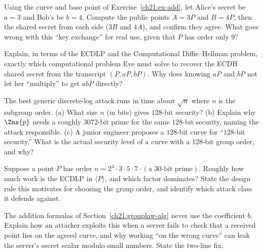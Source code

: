 \begin{exercise}
\label{ch21:ex-ecdh}
Using the curve and base point of Exercise~\ref{ch21:ex-add}, let Alice's secret be
$a=3$ and Bob's be $b=4$. Compute the public points $A=3P$ and $B=4P$, then the shared
secret from each side ($3B$ and $4A$), and confirm they agree. What goes wrong with this
``key exchange'' for real use, given that $P$ has order only $9$?
\end{exercise}

\begin{exercise}
\label{ch21:ex-eve}
Explain, in terms of the ECDLP and the Computational Diffie--Hellman problem, exactly
which computational problem Eve must solve to recover the ECDH shared secret from the
transcript $(P, aP, bP)$. Why does knowing $aP$ and $bP$ not let her ``multiply'' to get
$abP$ directly?
\end{exercise}

\begin{exercise}
\label{ch21:ex-keysize}
The best generic discrete-log attack runs in time about $\sqrt n$ where $n$ is the
subgroup order. (a) What size $n$ (in bits) gives $128$-bit security? (b) Explain why
$\Zns{p}$ needs a roughly $3072$-bit prime for the same $128$-bit security, naming the
attack responsible. (c) A junior engineer proposes a $128$-bit curve for ``$128$-bit
security.'' What is the actual security level of a curve with a $128$-bit group order,
and why?
\end{exercise}

\begin{exercise}
\label{ch21:ex-pohlig}
Suppose a point $P$ has order $n = 2^4 \cdot 3 \cdot 5 \cdot 7 \cdot (\text{a }30\text{-bit prime})$.
Roughly how much work is the ECDLP in $\langle P\rangle$, and which factor dominates?
State the design rule this motivates for choosing the group order, and identify which
attack class it defends against.
\end{exercise}

\begin{exercise}
\label{ch21:ex-invalid}
The addition formulas of Section~\ref{ch21:grouplaw-alg} never use the coefficient $b$.
Explain how an attacker exploits this when a server fails to check that a received point
lies on the agreed curve, and why working ``on the wrong curve'' can leak the server's
secret scalar modulo small numbers. State the two-line fix.
\end{exercise}

